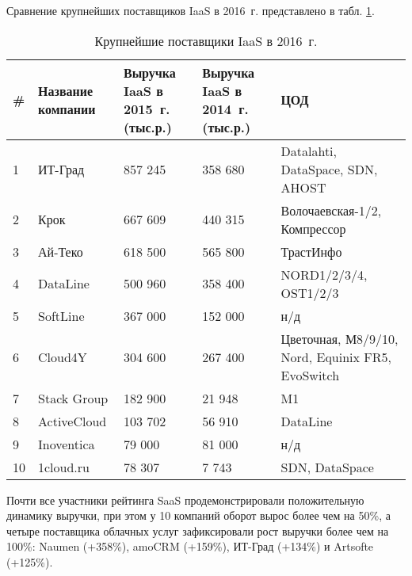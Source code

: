 Сравнение крупнейших поставщиков IaaS в 2016~г. \cite{cnews} представлено в табл. \ref{iaas-table}.
\begin{table}[H]
  \caption{Крупнейшие поставщики IaaS в 2016~г.}\label{iaas-table}
  \begin{tabular}{|p{0.5cm}|p{2.5cm}|p{3.5cm}|p{3.5cm}|p{4.5cm}|}
  \hline \# & Название компании & Выручка IaaS в 2015~г. (тыс.р.) & Выручка IaaS в 2014~г. (тыс.р.) & ЦОД \\
  \hline 1 & ИТ-Град & 857 245 & 358 680 & Datalahti, DataSpace, SDN, AHOST \\
  \hline 2 & Крок & 667 609 & 440 315 & Волочаевская-1/2, Компрессор \\
  \hline 3 & Ай-Теко & 618 500 & 565 800 & ТрастИнфо \\
  \hline 4 & DataLine & 500 960 & 358 400 & NORD1/2/3/4, OST1/2/3 \\
  \hline 5 & SoftLine & 367 000 & 152 000 & н/д \\
  \hline 6 & Cloud4Y & 304 600 & 267 400 & Цветочная, М8/9/10, Nord, Equinix FR5, EvoSwitch \\
  \hline 7 & Stack Group & 182 900 & 21 948 & M1 \\
  \hline 8 & ActiveCloud & 103 702 & 56 910 & DataLine \\
  \hline 9 & Inoventica & 79 000 & 81 000 & н/д \\
  \hline 10 & 1cloud.ru & 78 307 & 7 743 & SDN, DataSpace \\
  \hline
  \end{tabular}
\end{table}

Почти все участники рейтинга SaaS продемонстрировали положительную динамику выручки, при этом у 10 компаний оборот вырос более чем на 50\%, а четыре поставщика облачных услуг зафиксировали рост выручки более чем на 100\%: Naumen (+358\%), amoCRM (+159\%), ИТ-Град (+134\%) и Artsofte (+125\%).

